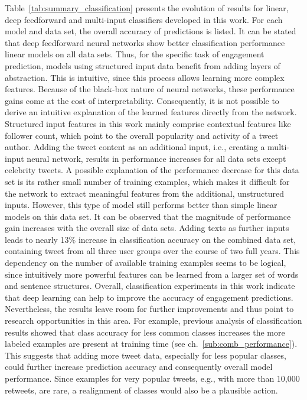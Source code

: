 Table~\ref{tab:summary_classification} presents the evolution of results for linear,
deep feedforward and multi-input classifiers developed in this work.
For each model and data set, the overall accuracy of predictions is listed.
It can be stated that deep feedforward neural networks show better classification
performance linear models on all data sets.
Thus, for the specific task of engagement prediction, models using structured
input data benefit from adding layers of abstraction.
This is intuitive, since this process allows learning more complex features.
Because of the black-box nature of neural networks, these performance gains
come at the cost of interpretability.
Consequently, it is not possible to derive an intuitive explanation of the learned
features directly from the network.
Structured input features in this work mainly comprise contextual features like
follower count, which point to the overall popularity and activity of a tweet
author.
Adding the tweet content as an additional input, i.e., creating a multi-input
neural network, results in performance increases for all data sets except
celebrity tweets.
A possible explanation of the performance decrease for this data set is its rather small number of
training examples, which makes it difficult for the network to extract meaningful
features from the additional, unstructured inputs.
However, this type of model still performs better than simple linear models
on this data set.
It can be observed that the magnitude of performance gain increases with the
overall size of data sets.
Adding texts as further inputs leads to nearly 13\% increase in classification
accuracy on the combined data set, containing tweet from all three user groups
over the course of two full years.
This dependency on the number of available training examples seems to be logical,
since intuitively more powerful features can be learned from a larger set of words and
sentence structures.
Overall, classification experiments in this work indicate that
deep learning can help to improve the accuracy of engagement predictions.
Nevertheless, the results leave room for further improvements and thus point
to research opportunities in this area.
For example, previous analysis of classification results showed that class accuracy for less
common classes increases the more labeled examples are present at training time (see ch.~\ref{sub:comb_performance}).
This suggests that adding more tweet data, especially for less popular classes,
could further increase prediction accuracy and consequently overall model performance.
Since examples for very popular tweets, e.g., with more than 10,000 retweets, are
rare, a realignment of classes would also be a plausible action.

